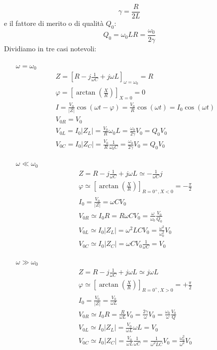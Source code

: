 \begin{equation}
\gamma = \frac{R}{2L}
\end{equation}
e il fattore di merito o di qualità $Q_0$:
\begin{equation}
Q_0 = {\omega_0L}{R}=\frac{\omega_0}{2\gamma}
\end{equation}
Dividiamo in tre casi notevoli:
\begin{itemize}
\item[$\omega=\omega_0$]
\begin{gather}
Z = \left[R-j\frac{1}{\omega C}+j\omega L\right]_{\omega=\omega_0}=R\\
\varphi = \left[\arctan\left(\frac{X}{R}\right)\right]_{X=0}=0\\
I = \frac{V_0}{|Z|}\cos\left(\omega t-\varphi\right)=\frac{V_0}{R}\cos(\omega t)=I_0\cos(\omega t)\\
V_{0R}=V_0\\
V_{0L}=I_0|Z_L|=\frac{V_0}{R}\omega_0 L=\frac{\omega_0}{2\gamma}V_0=Q_0V_0\\
V_{0C}=I_0|Z_C|=\frac{V_0}{R}\frac{1}{\omega_0 C}=\frac{\omega_0}{2\gamma}V_0=Q_0V_0
\end{gather}
\item[$\omega\ll\omega_0$]
\begin{gather}
Z=R-j\frac{1}{\omega C}+j\omega L\simeq -\frac{1}{\omega C}j\\
\varphi \simeq \left[\arctan\left(\frac{X}{R}\right)\right]_{R=0^+,X<0}=-\frac{\pi}{2}\\
I_0 = \frac{V_0}{|Z|}=\omega C V_0\\
V_{0R}\simeq I_0R=R\omega C V_0=\frac{\omega}{\omega_0}\frac{V_0}{Q_0}\\
V_{0L}\simeq I_0|Z_L|=\omega^2LCV_0=\frac{\omega^2}{\omega_0^2}V_0\\
V_{0C}\simeq I_0|Z_C|=\omega C V_0\frac{1}{\omega C}=V_0
\end{gather}
\item[$\omega\gg\omega_0$]
\begin{gather}
Z=R-j\frac{1}{\omega C}+j\omega L\simeq j\omega L\\
\varphi \simeq \left[\arctan\left(\frac{X}{R}\right)\right]_{R=0^+,X>0}=+\frac{\pi}{2}\\
I_0 = \frac{V_0}{|Z|}= \frac{V_0}{\omega L}\\
V_{0R}\simeq I_0R=\frac{R}{\omega L}V_0=\frac{2\gamma}{\omega}V_0=\frac{\omega_0}{\omega}\frac{V_0}{Q}\\
V_{0L}\simeq I_0|Z_L|=\frac{V_0}{\omega L}\omega L=V_0\\
V_{0C}\simeq I_0|Z_C|=\frac{V_0}{\omega L}\frac{1}{\omega C}=\frac{1}{\omega^2 LC}V_0=\frac{\omega_0^2}{\omega^2}V_0
\end{gather}
\end{itemize}

